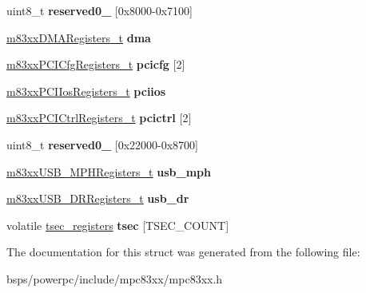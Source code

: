 \begin{DoxyCompactItemize}
\item 
\mbox{\label{structm83xxRegisters___afa2f57163854240c4af0357b3736fd86}} 
uint8\+\_\+t {\bfseries reserved0\+\_} \mbox{[}0x8000-\/0x7100\mbox{]}
\item 
\mbox{\label{structm83xxRegisters___ad7a4187b483d90de81dbdb2fd6718242}} 
\mbox{\hyperlink{structm83xxDMARegisters__}{m83xx\+D\+M\+A\+Registers\+\_\+t}} {\bfseries dma}
\item 
\mbox{\label{structm83xxRegisters___ae62eaff4328a0cfa2ba9bb9c1a9dd017}} 
\mbox{\hyperlink{structm83xxPCICfgRegisters__}{m83xx\+P\+C\+I\+Cfg\+Registers\+\_\+t}} {\bfseries pcicfg} \mbox{[}2\mbox{]}
\item 
\mbox{\label{structm83xxRegisters___acf2dd885f53e3d1c9af14fca8daf62bb}} 
\mbox{\hyperlink{structm83xxPCIIosRegisters__}{m83xx\+P\+C\+I\+Ios\+Registers\+\_\+t}} {\bfseries pciios}
\item 
\mbox{\label{structm83xxRegisters___a7354ac5226c82576295bade0941f3d17}} 
\mbox{\hyperlink{structm83xxPCICtrlRegisters__}{m83xx\+P\+C\+I\+Ctrl\+Registers\+\_\+t}} {\bfseries pcictrl} \mbox{[}2\mbox{]}
\item 
\mbox{\label{structm83xxRegisters___abd8462b8aab34025db4ad227ab91a149}} 
uint8\+\_\+t {\bfseries reserved0\+\_} \mbox{[}0x22000-\/0x8700\mbox{]}
\item 
\mbox{\label{structm83xxRegisters___aa55e5846ee58a250152cd5c3d1a16072}} 
\mbox{\hyperlink{structm83xxUSB__MPHRegisters__}{m83xx\+U\+S\+B\+\_\+\+M\+P\+H\+Registers\+\_\+t}} {\bfseries usb\+\_\+mph}
\item 
\mbox{\label{structm83xxRegisters___a2ba4e2bdc189730d1373b2f0902fc386}} 
\mbox{\hyperlink{structm83xxUSB__DRRegisters__}{m83xx\+U\+S\+B\+\_\+\+D\+R\+Registers\+\_\+t}} {\bfseries usb\+\_\+dr}
\item 
\mbox{\label{structm83xxRegisters___a8054419f2d765ae745db168fae23257f}} 
volatile \mbox{\hyperlink{structtsec__registers}{tsec\+\_\+registers}} {\bfseries tsec} \mbox{[}T\+S\+E\+C\+\_\+\+C\+O\+U\+NT\mbox{]}
\end{DoxyCompactItemize}


The documentation for this struct was generated from the following file\+:\begin{DoxyCompactItemize}
\item 
bsps/powerpc/include/mpc83xx/mpc83xx.\+h\end{DoxyCompactItemize}

